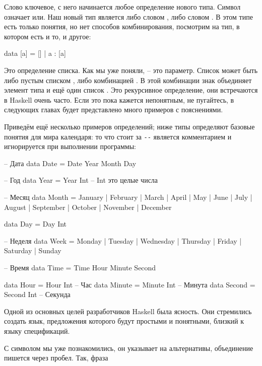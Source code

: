 Слово   ключевое, с него 
начинается любое определение нового
типа. Символ \In{|} означает или. Наш новый тип 
является либо словом , либо словом .
В этом типе есть только понятия, но нет способов комбинирования,
посмотрим на тип, в котором есть и то, и другое:

\begin{code}
data [a] = [] | a : [a]
\end{code}

Это определение списка. Как мы уже поняли,  -- это параметр.
Список \In{[a]} может быть либо пустым списком \In{[]}, либо
комбинацией . В этой комбинации знак \In{:} объединяет
элемент типа  и ещё один список \In{[a]}. Это рекурсивное
определение, они встречаются в Haskell очень часто.
Если это пока кажется непонятным, не пугайтесь, в следующих
главах будет представлено много примеров с пояснениями.

Приведём ещё несколько примеров определений; ниже
типы определяют базовые понятия для мира календаря: 
то что стоит за \verb!--! является
комментарием и игнорируется при выполнении программы: 

\begin{code}
-- Дата
data Date = Date Year Month Day

-- Год
data Year  = Year Int       -- Int это целые числа

-- Месяц
data Month  = January    | February   | March    | April          
            | May        | June       | July     | August   
            | September  | October    | November | December 

data Day = Day Int

-- Неделя
data Week  = Monday     | Tuesday   | Wednesday 
           | Thursday   | Friday    | Saturday     
           | Sunday     

-- Время
data Time = Time Hour Minute Second

data Hour   = Hour   Int    -- Час
data Minute = Minute Int    -- Минута
data Second = Second Int    -- Секунда
\end{code}

Одной из основных целей разработчиков Haskell была 
ясность. Они стремились создать язык, предложения которого
будут простыми и понятными, близкий к языку спецификаций.

С символом \In{|} мы уже познакомились, он указывает на альтернативы,
объединение пишется через пробел. Так, фраза

